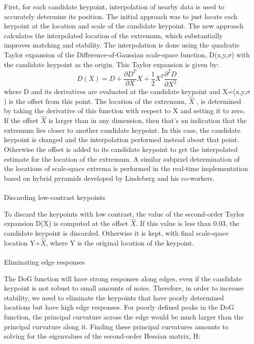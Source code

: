 \documentclass[12pt]{article}
\begin{document}
\begin{itemize}
	First, for each candidate keypoint, interpolation of nearby data is used to accurately determine its position. The initial approach was to just locate each keypoint at the location and scale of the candidate keypoint. The new approach calculates the interpolated location of the extremum, which substantially improves matching and stability. The interpolation is done using the quadratic Taylor expansion of the Difference-of-Gaussian scale-space function, D(x,y,$\sigma$) with the candidate keypoint as the origin. This Taylor expansion is given by:
\begin{equation}
D(X)=D+\frac{\partial D^T}{\partial X}X+\frac{1}{2}X^T \frac{\partial^2 D}{\partial X^2}
\end{equation}
where D and its derivatives are evaluated at the candidate keypoint and  X=(x,y,$\sigma$) is the offset from this point. The location of the extremum, $\hat{X}$ , is determined by taking the derivative of this function with respect to X and setting it to zero. If the offset $\hat{X}$ is larger than   in any dimension, then that's an indication that the extremum lies closer to another candidate keypoint. In this case, the candidate keypoint is changed and the interpolation performed instead about that point. Otherwise the offset is added to its candidate keypoint to get the interpolated estimate for the location of the extremum. A similar subpixel determination of the locations of scale-space extrema is performed in the real-time implementation based on hybrid pyramids developed by Lindeberg and his co-workers.
 	\paragraph{}
	\subitem Discarding low-contrast keypoints
	
	To discard the keypoints with low contrast, the value of the second-order Taylor expansion D(X) is computed at the offset $\hat{X}$. If this value is less than 0.03, the candidate keypoint is discarded. Otherwise it is kept, with final scale-space location Y+$\hat{X}$, where Y is the original location of the keypoint.
	\paragraph{}
	\subitem Eliminating edge responses
	
	The DoG function will have strong responses along edges, even if the candidate keypoint is not robust to small amounts of noise. Therefore, in order to increase stability, we need to eliminate the keypoints that have poorly determined locations but have high edge responses.
For poorly defined peaks in the DoG function, the principal curvature across the edge would be much larger than the principal curvature along it. Finding these principal curvatures amounts to solving for the eigenvalues of the second-order Hessian matrix, H:



\end{itemize}
\end{document}
